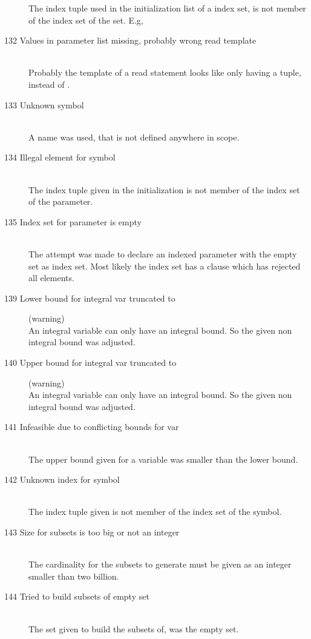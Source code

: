 \begin{description}
   The index tuple used in the initialization list of a index set, is
   not member of the index set of the set.
   E.g, 
\item[132 Values in parameter list missing, probably wrong read
  template]\ \\
  Probably the template of a read statement looks
  like  only having a tuple, instead of .
\item[133 Unknown symbol \code{xxx}]\ \\
  A name was used, that is not defined anywhere in scope.
\item[134 Illegal element \code{xxx} for symbol]\ \\
  The index tuple given in the initialization is not member of the
  index set of the parameter.
\item[135 Index set for parameter \code{xxx} is empty]\ \\
  The attempt was made to declare an indexed parameter with the
  empty set as index set. Most likely the index set has a 
  clause which has rejected all elements.
%
%
\item[139 Lower bound for integral var \code{xxx} truncated to
  \code{yyy}] (warning)\ \\
  An integral variable can only have an integral bound. So the given
  non integral bound was adjusted.
\item[140 Upper bound for integral var \code{xxx} truncated to
  \code{yyy}] (warning)\ \\
  An integral variable can only have an integral bound. So the given
  non integral bound was adjusted.
\item[141 Infeasible due to conflicting bounds for var \code{xxx}]\ \\
  The upper bound given for a variable was smaller than the lower bound.
\item[142 Unknown index \code{xxx} for symbol \code{yyy}]\ \\
  The index tuple given is not member of the index set of the symbol.
\item[143 Size for subsets \code{xxx} is too big or not an integer]\ \\
  The cardinality for the subsets to generate must be given as an
  integer smaller than two billion.
\item[144 Tried to build subsets of empty set]\ \\
  The set given to build the subsets of, was the empty set.

\end{description}
